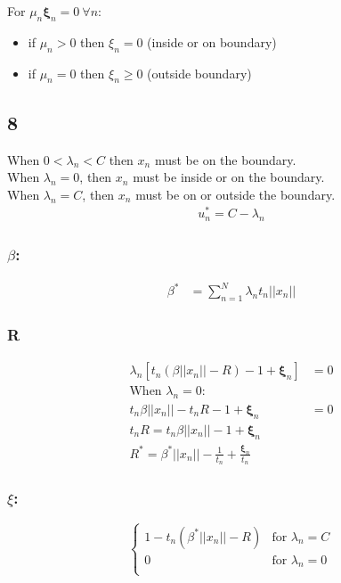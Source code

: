 \documentclass[a4paper]{article}
\begin{document}
For $\mu_{n}\pmb{\xi}_{n} = 0 \ \forall n$:\\
\begin{itemize}
    \item if $\mu_{n} > 0$ then $ \xi_{n}  = 0$ (inside or on boundary)
    \item if $\mu_{n} = 0$ then $ \xi_{n}  \geq 0$ (outside  boundary)
\end{itemize}


\subsection*{8}
When $0 < \lambda_{n} < C$ then $x_{n}$ must be on the boundary.\\
When $\lambda_{n} = 0$, then $x_{n}$ must be inside or on the boundary.\\
When $\lambda_{n} = C$, then $x_{n}$ must be on or outside the boundary.\\

\begin{align*}
    u_{n}^{*} = C - \lambda_{n}
\end{align*}

\subsubsection*{$\beta$:}
\begin{align*}
    \beta^{*} &= \sum_{n=1}^{N}\lambda_{n}t_{n}||x_{n}||
\end{align*}

\subsubsection*{R}
\begin{align*}
   \lambda_{n}[t_{n}(\beta||x_{n}|| - R) - 1 + \pmb{\xi}_{n}] &= 0 \\
   \text{When } \lambda_{n} = 0: \\
   t_{n}\beta||x_{n}|| - t_{n}R - 1 + \pmb{\xi}_{n} &= 0 \\
   t_{n}R = t_{n}\beta||x_{n}|| - 1 + \pmb{\xi}_{n}   \\
   R^{*} = \beta^{*}||x_{n}|| - \frac{1}{t_{n}} + \frac{\pmb{\xi}_{n}}{t_{n}}
\end{align*}

\subsubsection*{$\xi$:}
\[
\begin{cases}
    1 - t_{n}(\beta^{*}||x_{n}|| - R) & \text{for }\lambda_{n} = C \\
    0 & \text{for }\lambda_{n} = 0\\
\end{cases}
\]
 
\end{document}
